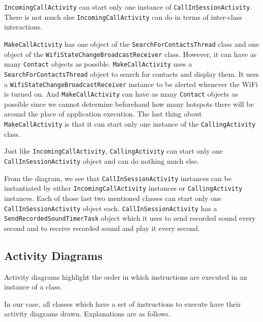 \documentclass[12pt,svgnames,smaller]{article} %
\begin{document}
	\texttt{IncomingCallActivity} can start only one instance of \texttt{CallInSessionActivity}. There is not much else \texttt{IncomingCallActivity} can do in terms of inter-class interactions.
	
	\texttt{MakeCallActivity} has one object of the \texttt{SearchForContactsThread} class and one object of the \texttt{WifiStateChangeBroadcastReceiver} class. However, it can have as many \texttt{Contact} objects as possible. \texttt{MakeCallActivity} uses a \texttt{SearchForContactsThread} object to search for contacts and display them. It uses a \texttt{WifiStateChangeBroadcastReceiver} instance to be alerted whenever the WiFi is turned on. And \texttt{MakeCallActivity} can have as many \texttt{Contact} objects as possible since  we cannot determine beforehand how many hotspots there will be around the place of application execution. The last thing about \texttt{MakeCallActivity} is that it can start only one instance of the \texttt{CallingActivity} class. 
	
	Just like \texttt{IncomingCallActivity}, \texttt{CallingActivity} can start only one \texttt{CallInSessionActivity} object and can do nothing much else.
	
	From the diagram, we see that \texttt{CallInSessionActivity} instances can be instantiated by either \texttt{IncomingCallActivity} instances or \texttt{CallingActivity} instances. Each of those last two mentioned classes can start only one \texttt{CallInSessionActivity} object each. \texttt{CallInSessionActivity} has a \texttt{SendRecordedSoundTimerTask} object which it uses to send recorded sound every second and to receive recorded sound and play it every second.
	
	
	\subsection{Activity Diagrams}
	
	Activity diagrams highlight the order in which instructions are executed in an instance of a class.
	
	In our case, all classes which have a set of instructions to execute have their activity diagrams drawn. Explanations are as follows.
	
\end{document}
